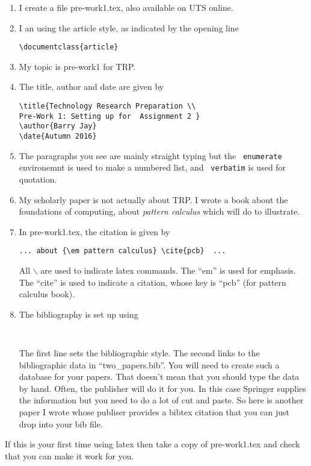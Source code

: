 \documentclass{article}
\begin{document}
\begin{enumerate}
\item I create a file
  pre-work1.tex, also available on UTS online.
\item
I an using the article style, as indicated by the opening line
\begin{verbatim}
\documentclass{article}
\end{verbatim}
\item
My topic is pre-work1 for TRP. 
\item 
The title, author and date are given by 
\begin{verbatim}
\title{Technology Research Preparation \\
Pre-Work 1: Setting up for  Assignment 2 }
\author{Barry Jay}
\date{Autumn 2016}
\end{verbatim}
\item The paragraphs you see are mainly straight typing but the {\tt
    enumerate} environemnt is used to make a numbered list, and {\tt
    verbatim} is used for quotation. 
\item My scholarly paper is not actually about TRP. I wrote a book
  about the foundations of computing, about {\em pattern calculus}
  \cite{pcb} which will do to illustrate. 
\item
In pre-work1.tex, the citation is given by 
\begin{verbatim}
... about {\em pattern calculus} \cite{pcb}  ...
\end{verbatim}
All $\backslash$ are used to indicate latex commands. The ``em'' is
used for emphasis. The ``cite'' is used to indicate a citation, whose
key is ``pcb'' (for pattern calculus book).
\item
The bibliography is set up using 
\begin{verbatim}


\end{verbatim}
The first line sets the bibliographic style. The second links to the
bibliographic data in ``two\_papers.bib''. You will need to create
such a database for your papers.  That doesn't mean that you should
type the data by hand. Often, the publisher will do it for you. In
this case Springer supplies the information but you need to do a lot
of cut and paste. So here is another paper I wrote \cite{JK09} whose
publiser provides a bibtex citation that you can just drop into your
bib file. 
\end{enumerate}

If this is your first time using latex then take a copy of pre-work1.tex and check that you can make it work for you. 





\end{document}
